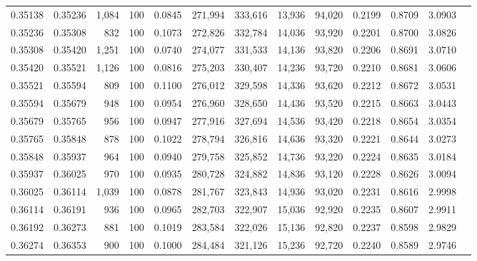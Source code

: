 \begin{tabular}{rrrrrrrrrrrrr}
0.35138 & 0.35236 & 1,084 & 100 &                                     0.0845 & 271,994 & 333,616 &  13,936 &  94,020 & 0.2199 & 0.8709 & 3.0903 \\
0.35236 & 0.35308 &   832 & 100 &                                     0.1073 & 272,826 & 332,784 &  14,036 &  93,920 & 0.2201 & 0.8700 & 3.0826 \\
0.35308 & 0.35420 & 1,251 & 100 &                                     0.0740 & 274,077 & 331,533 &  14,136 &  93,820 & 0.2206 & 0.8691 & 3.0710 \\
0.35420 & 0.35521 & 1,126 & 100 &                                     0.0816 & 275,203 & 330,407 &  14,236 &  93,720 & 0.2210 & 0.8681 & 3.0606 \\
0.35521 & 0.35594 &   809 & 100 &                                     0.1100 & 276,012 & 329,598 &  14,336 &  93,620 & 0.2212 & 0.8672 & 3.0531 \\
0.35594 & 0.35679 &   948 & 100 &                                     0.0954 & 276,960 & 328,650 &  14,436 &  93,520 & 0.2215 & 0.8663 & 3.0443 \\
0.35679 & 0.35765 &   956 & 100 &                                     0.0947 & 277,916 & 327,694 &  14,536 &  93,420 & 0.2218 & 0.8654 & 3.0354 \\
0.35765 & 0.35848 &   878 & 100 &                                     0.1022 & 278,794 & 326,816 &  14,636 &  93,320 & 0.2221 & 0.8644 & 3.0273 \\
0.35848 & 0.35937 &   964 & 100 &                                     0.0940 & 279,758 & 325,852 &  14,736 &  93,220 & 0.2224 & 0.8635 & 3.0184 \\
0.35937 & 0.36025 &   970 & 100 &                                     0.0935 & 280,728 & 324,882 &  14,836 &  93,120 & 0.2228 & 0.8626 & 3.0094 \\
0.36025 & 0.36114 & 1,039 & 100 &                                     0.0878 & 281,767 & 323,843 &  14,936 &  93,020 & 0.2231 & 0.8616 & 2.9998 \\
0.36114 & 0.36191 &   936 & 100 &                                     0.0965 & 282,703 & 322,907 &  15,036 &  92,920 & 0.2235 & 0.8607 & 2.9911 \\
0.36192 & 0.36273 &   881 & 100 &                                     0.1019 & 283,584 & 322,026 &  15,136 &  92,820 & 0.2237 & 0.8598 & 2.9829 \\
0.36274 & 0.36353 &   900 & 100 &                                     0.1000 & 284,484 & 321,126 &  15,236 &  92,720 & 0.2240 & 0.8589 & 2.9746 \\

\end{tabular}
